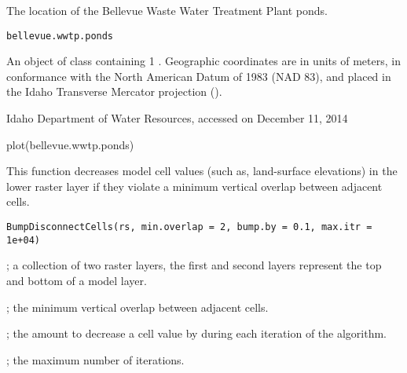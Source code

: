 \documentclass[letterpaper]{book}
\begin{document}
%
\begin{Description}\relax
The location of the Bellevue Waste Water Treatment Plant ponds.
\end{Description}
%
\begin{Usage}
\begin{verbatim}
bellevue.wwtp.ponds
\end{verbatim}
\end{Usage}
%
\begin{Format}
An object of  class containing 1 .
Geographic coordinates are in units of meters, in conformance with the North American Datum of 1983 (NAD 83), and placed in the
Idaho Transverse Mercator projection ().
\end{Format}
%
\begin{Source}\relax
Idaho Department of Water Resources, accessed on December 11, 2014
\end{Source}
%
\begin{Examples}
\begin{ExampleCode}
plot(bellevue.wwtp.ponds)
\end{ExampleCode}
\end{Examples}
%
\begin{Description}\relax
This function decreases model cell values (such as, land-surface elevations) in the lower raster layer if they violate a minimum vertical overlap between adjacent cells.
\end{Description}
%
\begin{Usage}
\begin{verbatim}
BumpDisconnectCells(rs, min.overlap = 2, bump.by = 0.1, max.itr = 1e+04)
\end{verbatim}
\end{Usage}
%
\begin{Arguments}
\begin{ldescription}
\item[\code{rs}] ; a collection of two raster layers, the first and second layers represent the top and bottom of a model layer.
\item[\code{min.overlap}] ; the minimum vertical overlap between adjacent cells.
\item[\code{bump.by}] ; the amount to decrease a cell value by during each iteration of the algorithm.
\item[\code{max.itr}] ; the maximum number of iterations.
\end{ldescription}
\end{Arguments}
\end{document}
